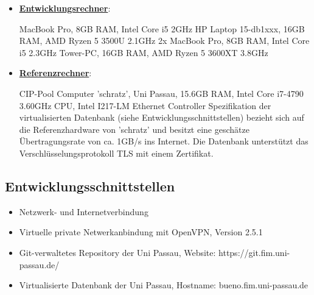 \documentclass{article}
\begin{document}
\begin{itemize}
\item \underline{\textbf{Entwicklungsrechner}}: 
\begin{flushleft}
MacBook Pro, 8GB RAM, Intel Core i5 2GHz  \linebreak
HP Laptop 15-db1xxx, 16GB RAM, AMD Ryzen 5 3500U 2.1GHz \linebreak
2x MacBook Pro, 8GB RAM, Intel Core i5 2.3GHz \linebreak
Tower-PC, 16GB RAM, AMD Ryzen 5 3600XT 3.8GHz \linebreak
\end{flushleft}
\item \underline{\textbf{Referenzrechner}}:
\begin{flushleft}
CIP-Pool Computer 'schratz', Uni Passau, 15.6GB RAM, Intel Core i7-4790 3.60GHz CPU, Intel I217-LM Ethernet Controller \linebreak
Spezifikation der virtualisierten Datenbank (siehe Entwicklungsschnittstellen) bezieht sich auf die Referenzhardware von 'schratz' und besitzt eine geschätze Übertragungsrate von ca. 1GB/s ins Internet. Die Datenbank unterstützt das Verschlüsselungsprotokoll TLS mit einem Zertifikat. \linebreak
\end{flushleft}
\end{itemize}

\subsection{Entwicklungsschnittstellen}

\begin{itemize}
\item \begin{flushleft} Netzwerk- und Internetverbindung \end{flushleft} 
\item \begin{flushleft} Virtuelle private Netwerkanbindung mit OpenVPN, Version 2.5.1 \end{flushleft} 
\item \begin{flushleft} Git-verwaltetes Repository der Uni Passau, Website: https://git.fim.uni-passau.de/ \end{flushleft} 
\item \begin{flushleft} Virtualisierte Datenbank der Uni Passau, Hostname: bueno.fim.uni-passau.de \end{flushleft}
\end{itemize}
\end{document}

